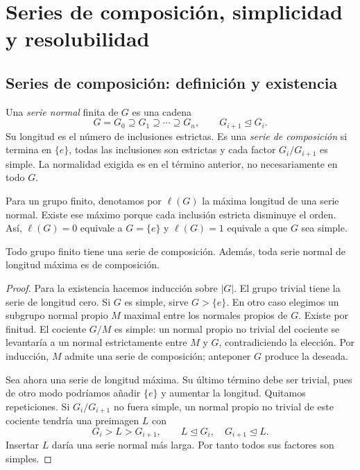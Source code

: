 \section{Series de composición, simplicidad y resolubilidad}\label{sec:grupos-composicion}

\subsection{Series de composición: definición y existencia}\label{tema:8-1-1a}\label{tema:8-1-1c}
\begin{defi}
Una \emph{serie normal} finita de $G$ es una cadena
\[
G=G_0\supseteq G_1\supseteq\cdots\supseteq G_n,
\qquad G_{i+1}\trianglelefteq G_i.
\]
Su longitud es el número de inclusiones estrictas. Es una \emph{serie de composición} si termina en $\{e\}$, todas las inclusiones son estrictas y cada factor $G_i/G_{i+1}$ es simple. La normalidad exigida es en el término anterior, no necesariamente en todo $G$.
\end{defi}
Para un grupo finito, denotamos por $\ell(G)$ la máxima longitud de una serie normal. Existe ese máximo porque cada inclusión estricta disminuye el orden. Así, $\ell(G)=0$ equivale a $G=\{e\}$ y $\ell(G)=1$ equivale a que $G$ sea simple.

\begin{prop}\label{prop:C8-existencia}
Todo grupo finito tiene una serie de composición. Además, toda serie normal de longitud máxima es de composición.
\end{prop}
\begin{proof}
Para la existencia hacemos inducción sobre $|G|$. El grupo trivial tiene la serie de longitud cero. Si $G$ es simple, sirve $G>\{e\}$. En otro caso elegimos un subgrupo normal propio $M$ maximal entre los normales propios de $G$. Existe por finitud. El cociente $G/M$ es simple: un normal propio no trivial del cociente se levantaría a un normal estrictamente entre $M$ y $G$, contradiciendo la elección. Por inducción, $M$ admite una serie de composición; anteponer $G$ produce la deseada.

Sea ahora una serie de longitud máxima. Su último término debe ser trivial, pues de otro modo podríamos añadir $\{e\}$ y aumentar la longitud. Quitamos repeticiones. Si $G_i/G_{i+1}$ no fuera simple, un normal propio no trivial de este cociente tendría una preimagen $L$ con
\[
G_i>L>G_{i+1},\qquad L\trianglelefteq G_i,
\quad G_{i+1}\trianglelefteq L.
\]
Insertar $L$ daría una serie normal más larga. Por tanto todos sus factores son simples.
\end{proof}

